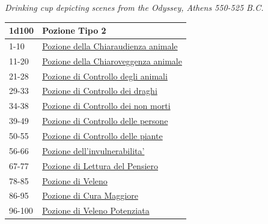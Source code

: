 \begin{multicols}{2}
{\begin{center}
\emph{Drinking cup depicting scenes from the Odyssey, Athens 550-525 B.C.}
\end{center}
\hypertarget{Pozione Tipo 2}{}
{\small\begin{tabularx}{\linewidth}{ll}
		\toprule
\rowcolor{gray!20}\textbf{1d100} & \textbf{Pozione Tipo 2}\\
\toprule
1-10 & \hyperlink{Pozione della Chiaraudienzaa nimale}{Pozione della Chiaraudienza animale}\\
\rowcolor{gray!20}11-20 & \hyperlink{Pozione della Chiaroveggenza animale}{Pozione della Chiaroveggenza animale}\\
21-28 & \hyperlink{Pozione di Controllo degli animali}{Pozione di Controllo degli animali}\\
\rowcolor{gray!20}29-33 & \hyperlink{Pozione di Controllo dei draghi}{Pozione di Controllo dei draghi}\\
34-38 & \hyperlink{Pozione di Controllo dei nonmorti}{Pozione di Controllo dei non morti}\\
\rowcolor{gray!20}39-49 & \hyperlink{Pozione di Controllo delle persone}{Pozione di Controllo delle persone}\\
50-55 & \hyperlink{Pozione di Controllo delle piante}{Pozione di Controllo delle piante}\\
\rowcolor{gray!20}56-66 & \hyperlink{Pozione dell'invulnerabilita'}{Pozione dell'invulnerabilita'}\\
67-77 & \hyperlink{Pozione di Letturadel Pensiero}{Pozione di Lettura del Pensiero}\\
\rowcolor{gray!20}78-85 & \hyperlink{Pozione di Veleno}{Pozione di Veleno}\\
86-95 & \hyperlink{pozionifiltri}{Pozione di Cura Maggiore}\\
\rowcolor{gray!20}96-100 & \hyperlink{pozionifiltri}{Pozione di Veleno Potenziata}
\end{tabularx}}

\medskip\hypertarget{Pozione Tipo 3}{}

}
\end{multicols}
